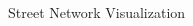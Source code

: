 \documentclass[9pt, aspectratio=169]{beamer}
\begin{document}
\begin{frame}{Street Network Visualization}
\begin{minipage}[0.3\textheight]{\textwidth}
\begin{columns}[T]
\begin{column}{0.6\textwidth}
\begin{figure}[h!]
\end{figure}
        \end{column}
    \end{columns}
\end{minipage}
\end{frame}
\end{document}
